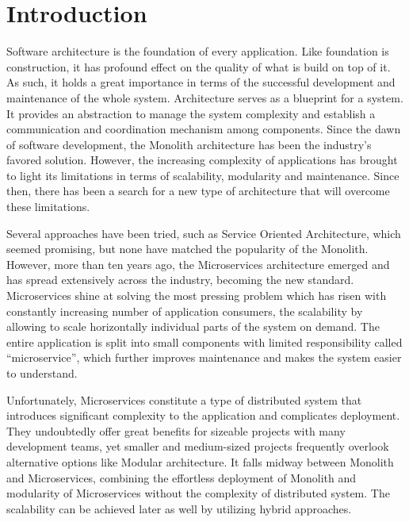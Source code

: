 
\chapter*{Introduction}
\setcounter{page}{1}

Software architecture is the foundation of every application. Like foundation is construction, it has profound effect on the quality of what is build on top of it. As such, it holds a great importance in terms of the successful development and maintenance of the whole system. Architecture serves as a blueprint for a system. It provides an abstraction to manage the system complexity and establish a communication and coordination mechanism among components. Since the dawn of software development, the Monolith architecture has been the industry's favored solution.  However, the increasing complexity of applications has brought to light its limitations in terms of scalability, modularity and maintenance. Since then, there has been a search for a new type of architecture that will overcome these limitations.

Several approaches have been tried, such as Service Oriented Architecture, which seemed promising, but none have matched the popularity of the Monolith. However, more than ten years ago, the Microservices architecture emerged and has spread extensively across the industry, becoming the new standard. Microservices shine at solving the most pressing problem which has risen with constantly increasing number of application consumers, the scalability by allowing to scale horizontally individual parts of the system on demand. The entire application is split into small components with limited responsibility called ``microservice'', which further improves maintenance and makes the system easier to understand.

Unfortunately, Microservices constitute a type of distributed system that introduces significant complexity to the application and complicates deployment. They undoubtedly offer great benefits for sizeable projects with many development teams, yet smaller and medium-sized projects frequently overlook alternative options like Modular architecture. It falls midway between Monolith and Microservices, combining the effortless deployment of Monolith and modularity of Microservices without the complexity of distributed system. The scalability can be achieved later as well by utilizing hybrid approaches.

